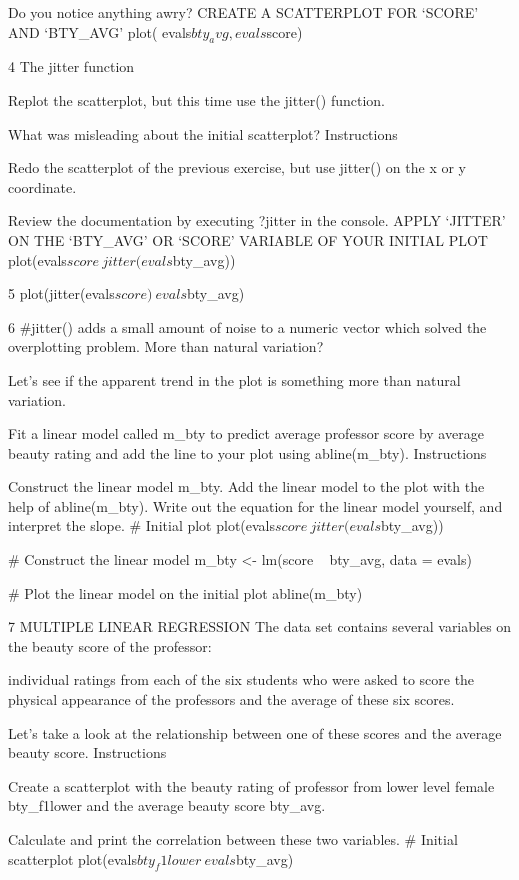 Do you notice anything awry?
CREATE A SCATTERPLOT FOR ‘SCORE’ AND ‘BTY_AVG’
plot( evals$bty_avg, evals$score)

4
The jitter function

Replot the scatterplot, but this time use the jitter() function. 

What was misleading about the initial scatterplot?
Instructions

Redo the scatterplot of the previous exercise, but use jitter() on the x or y coordinate. 

Review the documentation by executing ?jitter in the console.
APPLY ‘JITTER’ ON THE ‘BTY_AVG’ OR ‘SCORE’ VARIABLE OF YOUR INITIAL PLOT
plot(evals$score ~ jitter(evals$bty_avg))

5
plot(jitter(evals$score) ~ evals$bty_avg)

6
#jitter() adds a small amount of noise to a numeric vector which solved the overplotting problem.
More than natural variation?

Let's see if the apparent trend in the plot is something more than natural variation. 

Fit a linear model called m_bty to predict average professor score by average beauty rating
and add the line to your plot using abline(m_bty).
Instructions

Construct the linear model m_bty.
Add the linear model to the plot with the help of abline(m_bty).
Write out the equation for the linear model yourself, and interpret the slope.
# Initial plot
plot(evals$score ~ jitter(evals$bty_avg))

# Construct the linear model
m_bty <- lm(score ~ bty_avg, data = evals)

# Plot the linear model on the initial plot
abline(m_bty)

7
MULTIPLE LINEAR REGRESSION
The data set contains several variables on the beauty score of the professor: 

individual ratings from each of the six students who were asked to score the physical 
appearance of the professors and the average of these six scores.

Let's take a look at the relationship between one of these scores and the average 
beauty score.
Instructions

Create a scatterplot with the beauty rating of professor from lower level female bty_f1lower
and the average beauty score bty_avg.

Calculate and print the correlation between these two variables.
# Initial scatterplot
plot(evals$bty_f1lower ~ evals$bty_avg)

